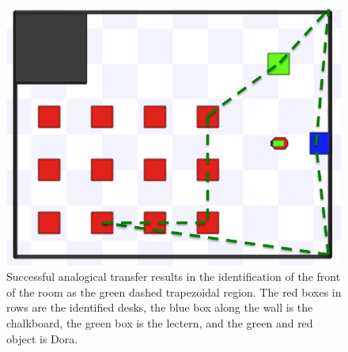\documentclass[letterpaper]{article}
\begin{document}
\begin{figure}[h]
  \includegraphics[width=\columnwidth]{images/target-success.png}
  \caption{Successful analogical transfer results in the identification of the front of the room as the green dashed trapezoidal region. The red boxes in rows are the identified desks, the blue box along the wall is the chalkboard, the green box is the lectern, and the green and red object is Dora.}
  \label{fig:success}
\end{figure}


\end{document}
